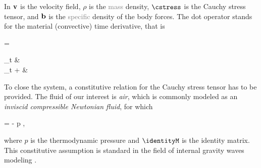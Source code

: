 \documentclass[../main.tex]{subfiles}
\begin{document}
In  $\mathbf{v}$ is the velocity field, $\rho$ is the \textcolor{gray}{mass} density, $\cstress$ is the Cauchy stress tensor, and $\mathbf{b}$ is the \textcolor{gray}{specific} density of the body forces. The dot operator stands for the material (convective) time derivative, that is 

\begin{equations}[single,*]
	\tdot{\varphi} = \begin{cases} \partial_t \varphi &  \\ \partial_t \varphi +  \cdot \grad \varphi &  \end{cases}
\end{equations} 

To close the system, a constitutive relation for the Cauchy stress tensor has to be provided. The fluid of our interest is \emph{air}, which is commonly modeled as an \emph{inviscid compressible Newtonian fluid}, for which

\begin{equations}[single,!,numberline=all]
\label{eq:CAUCHY}
\cstress = - p \identityM,
\end{equations}

where $p$ is the thermodynamic pressure and $\identityM$ is the identity matrix. This constitutive assumption is standard in the field of internal gravity waves modeling \autocite{teixeiraPhysicsOrographicGravity2014,smithInfluenceMountainsAtmosphere1979,frittsGravityWaveDynamics2003,doyleIntercomparisonTREXMountainwave2011}. 
\end{document}

